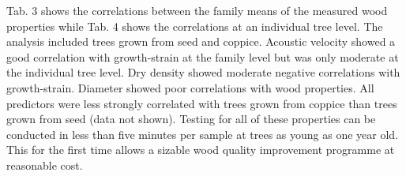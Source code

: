 Tab. 3 shows the correlations between the family means of the measured wood properties while Tab. 4 shows the correlations at an individual tree level. The analysis included trees grown from seed and coppice. Acoustic velocity showed a good correlation with growth-strain at the family level but was only moderate at the individual tree level. Dry density showed moderate negative correlations with growth-strain. Diameter showed poor correlations with wood properties. All predictors were less strongly correlated with trees grown from coppice than trees grown from seed (data not shown). Testing for all of these properties can be conducted in less than five minutes per sample at trees as young as one year old. This for the first time allows a sizable wood quality improvement programme at reasonable cost. 